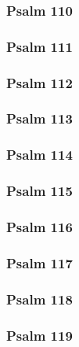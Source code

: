 \documentclass[12pt]{extarticle}
\begin{document}
\begin{multicols}{2}
\subsubsection{Psalm 110}

\newpage

\subsubsection{Psalm 111}

\newpage

\subsubsection{Psalm 112}

\newpage

\subsubsection{Psalm 113}

\newpage

\subsubsection{Psalm 114}

\newpage

\subsubsection{Psalm 115}

\newpage

\subsubsection{Psalm 116}

\newpage

\subsubsection{Psalm 117}

\newpage

\subsubsection{Psalm 118}




\newpage

\subsubsection{Psalm 119}

\newpage


\end{multicols}
\end{document}
